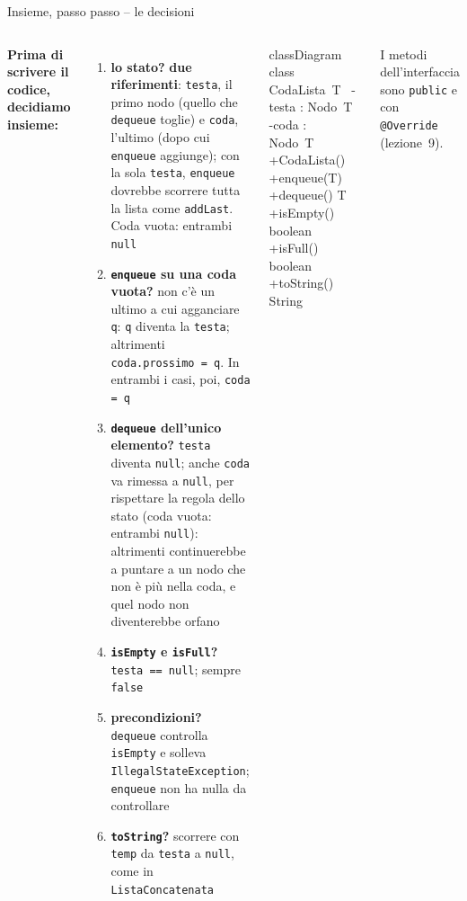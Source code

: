 \documentclass[10pt,aspectratio=169,xcolor={table}]{beamer}
\begin{document}
\begin{frame}[fragile]{Insieme, passo passo -- le decisioni}
\begin{columns}[T]
\footnotesize
\textbf{Prima di scrivere il codice, decidiamo insieme:}
\begin{enumerate}\itemsep=3pt
    \item \textbf{lo stato?} \textrightarrow{} \textbf{due riferimenti}: \texttt{testa}, il primo nodo (quello che \texttt{dequeue} toglie) e \texttt{coda}, l'ultimo (dopo cui \texttt{enqueue} aggiunge); con la sola \texttt{testa}, \texttt{enqueue} dovrebbe scorrere tutta la lista come \texttt{addLast}. Coda vuota: entrambi \texttt{null}
    \item \textbf{\texttt{enqueue} su una coda vuota?} \textrightarrow{} non c'è un ultimo a cui agganciare \texttt{q}: \texttt{q} diventa la \texttt{testa}; altrimenti \texttt{coda.prossimo = q}. In entrambi i casi, poi, \texttt{coda = q}
    \item \textbf{\texttt{dequeue} dell'unico elemento?} \textrightarrow{} \texttt{testa} diventa \texttt{null}; anche \texttt{coda} va rimessa a \texttt{null}, per rispettare la regola dello stato (coda vuota: entrambi \texttt{null}): altrimenti continuerebbe a puntare a un nodo che non è più nella coda, e quel nodo non diventerebbe orfano
    \item \textbf{\texttt{isEmpty} e \texttt{isFull}?} \textrightarrow{} \texttt{testa == null}; sempre \texttt{false}
    \item \textbf{precondizioni?} \textrightarrow{} \texttt{dequeue} controlla \texttt{isEmpty} e solleva \texttt{IllegalStateException}; \texttt{enqueue} non ha nulla da controllare
    \item \textbf{\texttt{toString}?} \textrightarrow{} scorrere con \texttt{temp} da \texttt{testa} a \texttt{null}, come in \texttt{ListaConcatenata}
\end{enumerate}

\begin{mermaid}
classDiagram
  class CodaLista~T~ {
    -testa : Nodo~T~
    -coda : Nodo~T~
    +CodaLista()
    +enqueue(T)
    +dequeue() T
    +isEmpty() boolean
    +isFull() boolean
    +toString() String
  }
\end{mermaid}
\footnotesize
I metodi dell'interfaccia sono \texttt{public} e con \texttt{@Override} (lezione~9).
\end{columns}
\end{frame}
\end{document}
